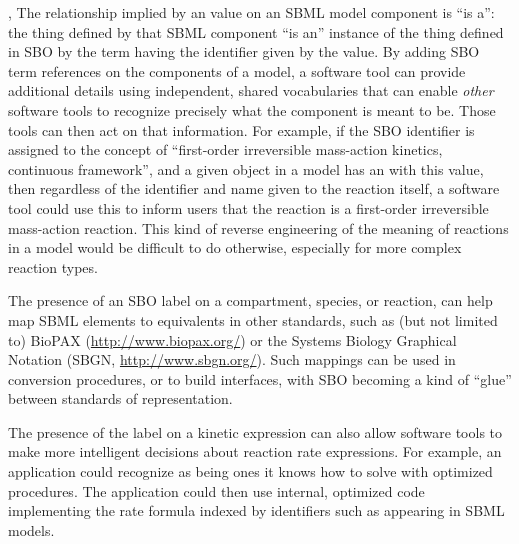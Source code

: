  ,    The relationship implied by an
 value on an SBML model component is ``is a'': the
thing defined by that SBML component ``is an'' instance of the
thing defined in SBO by the term having the identifier given by
the   value.  By adding SBO term
references on the components of a model, a software tool can
provide additional details using independent, shared vocabularies
that can enable \emph{other} software tools to recognize precisely
what the component is meant to be.  Those tools can then act on
that information.  For example, if the SBO identifier
 is assigned to the concept of ``first-order
irreversible mass-action kinetics, continuous framework'', and a
given \KineticLaw object in a model has an 
 with this value, then regardless of the
identifier and name given to the reaction itself, a software tool
could use this to inform users that the reaction is a first-order
irreversible mass-action reaction.  This kind of reverse
engineering of the meaning of reactions in a model would be
difficult to do otherwise, especially for more complex reaction
types.

\begin{blockChanged}

The presence of an SBO label on a compartment, species, or
reaction, can help map SBML elements to equivalents in
other standards, such as (but not limited to) BioPAX
(\url{http://www.biopax.org/}) or the Systems Biology Graphical
Notation (SBGN, \url{http://www.sbgn.org/}).  Such mappings can be
used in conversion procedures, or to build interfaces, with SBO
becoming a kind of ``glue'' between standards of representation.

\end{blockChanged}

The presence of the label on a kinetic expression can also allow
software tools to make more intelligent decisions about reaction
rate expressions.  For example, an application could recognize
  as being ones it
knows how to solve with optimized procedures.  The application
could then use internal, optimized code implementing the rate
formula indexed by identifiers such as 
appearing in SBML models.


